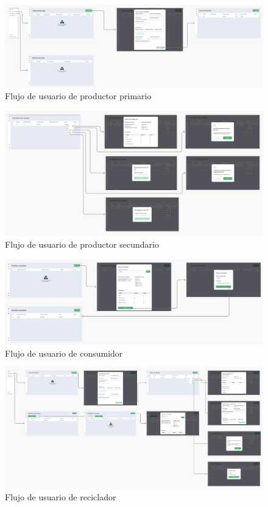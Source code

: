 \begin{figure}[!htb]
	\centering
	\includegraphics[width=\linewidth]{Figures/flow-primary-producer.png}
	\caption{Flujo de usuario de productor primario}
  \label{fig:flow-primary-producer}
\end{figure}

\begin{figure}[!htb]
	\centering
	\includegraphics[width=\linewidth]{Figures/flow-secondary-producer.png}
	\caption{Flujo de usuario de productor secundario}
  \label{fig:flow-secondary-producer}
\end{figure}

\begin{figure}[!htb]
	\centering
	\includegraphics[width=\linewidth]{Figures/flow-consumer.png}
	\caption{Flujo de usuario de consumidor}
  \label{fig:flow-consumer}
\end{figure}

\begin{figure}[!htb]
	\centering
	\includegraphics[width=\linewidth]{Figures/flow-recycler.png}
	\caption{Flujo de usuario de reciclador}
  \label{fig:flow-recycler}
\end{figure}


